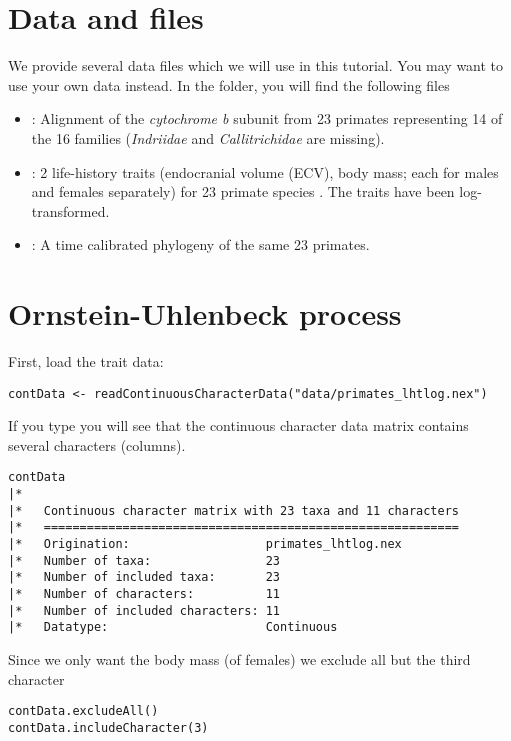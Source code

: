 \section{Data and files}

We provide several data files which we will use in this tutorial.
You may want to use your own data instead.
In the  folder, you will find the following files
\begin{itemize}
\item
{}: Alignment of the \textit{cytochrome b} subunit from 23 primates representing 14 of the 16 families (\textit{Indriidae} and \textit{Callitrichidae} are missing).

\item
{}: 2 life-history traits (endocranial volume (ECV), body mass; each for males and females separately)  for 23 primate species \citep[taken from the Anage database,][]{DeMagalhaes2009}. The traits have been log-transformed.

\item
{}: A time calibrated phylogeny of the same 23 primates.
\end{itemize}





\section{Ornstein-Uhlenbeck process}

First, load the trait data:
{\tt \small \begin{snugshade*}
\begin{lstlisting}
contData <- readContinuousCharacterData("data/primates_lhtlog.nex")
\end{lstlisting}
\end{snugshade*}}
If you type you will see that the continuous character data matrix contains several characters (columns). 
{\tt \small \begin{snugshade*}
\begin{lstlisting}
contData
|*
|*   Continuous character matrix with 23 taxa and 11 characters
|*   ==========================================================
|*   Origination:                   primates_lhtlog.nex
|*   Number of taxa:                23
|*   Number of included taxa:       23
|*   Number of characters:          11
|*   Number of included characters: 11
|*   Datatype:                      Continuous
\end{lstlisting}
\end{snugshade*}}
Since we only want the body mass (of females) we exclude all but the third character
{\tt \small \begin{snugshade*}
\begin{lstlisting}
contData.excludeAll()
contData.includeCharacter(3) 
\end{lstlisting}
\end{snugshade*}}

